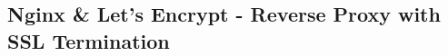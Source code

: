 \subsection{Nginx \& Let's Encrypt - Reverse Proxy with SSL Termination}\label{subsec:nginx-and-let's-encrypt-reverse-proxy-with-ssl-termination}

\begin{listing}[H]
    \inputminted{yaml}{listings/self_hosted_nginx/compose.yaml}
    \caption{Nginx \& Let's Encrypt Compose File}
    \label{lst:nginx-and-lets-encrypt-compose-yml}
\end{listing}
